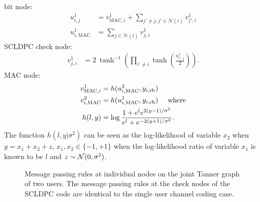 bit node:
\begin{align*}
u^{1}_{i,j}&=v^{1}_{\text{MAC},i}+ \sum_{j'\neq j,j'\in \mathcal{N}(i)} v^{1}_{j',i}\\
u^{1}_{i,\text{MAC}}&=\sum_{j\in \mathcal{N}(i)} v^{1}_{j,i}
\end{align*}
SCLDPC check node:
\begin{align*}
v^{1}_{j,i}&=2~\tanh^{-1}\left( \prod_{i'\neq i} \tanh\left(\frac{u^{1}_{i',j}}{2}\right)\right).
\end{align*}
MAC node:
\begin{align}
v^{1}_{\text{MAC},i}&=h(u^{2}_{i,\text{MAC}},y_{i,\text{ch}})\label{Eqn:MACnodeBP} \\
v^{2}_{i,\text{MAC}}&=h(u^{1}_{i,\text{MAC}},y_{i,\text{ch}}) ~~~\text{ where}\notag\\
h(l,y)&=\log \frac{1+e^{l}e^{2(y-1)/\sigma^2}}{e^{l}+e^{-2(y+1)/\sigma^2}}.\notag
\end{align}
The function $h(l,y|\sigma^2)$ can be seen as the log-likelihood of variable $x_2$ when $y=x_1+x_2+z$, $x_1,x_2\in\{-1,+1\}$ when the log-likelihood ratio of variable $x_1$ is known to be $l$ and $z\sim \mathcal{N}(0,\sigma^2)$.
\begin{figure}[!ht]
  \centering
  \resizebox{0.75\textwidth}{!}{}
  \caption{ Message passing rules at individual nodes on the joint Tanner graph of two users. The message passing rules at the check nodes of the SCLDPC code are identical to the single user channel coding case.}
  \label{fig:BP_computationgraph}
\end{figure}

